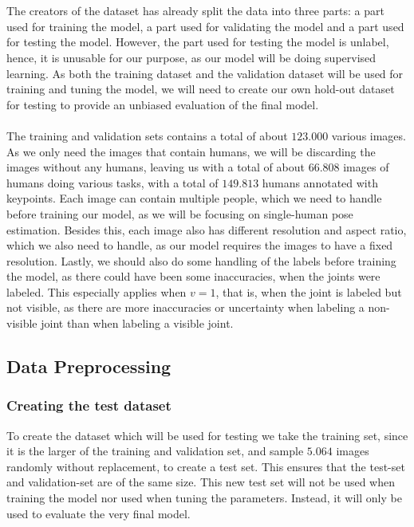 \documentclass[./main.tex]{subfiles}
\begin{document}
\\
\\
The creators of the dataset has already split the data into three parts: a part used for training the model, a part used for validating the model and a part used for testing the model. However, the part used for testing the model is unlabel, hence, it is unusable for our purpose, as our model will be doing supervised learning. As both the training dataset and the validation dataset will be used for training and tuning the model, we will need to create our own hold-out dataset for testing to provide an unbiased evaluation of the final model. 
\\
\\
The training and validation sets contains a total of about $123.000$ various images. As we only need the images that contain humans, we will be discarding the images without any humans, leaving us with a total of about $66.808$ images of humans doing various tasks, with a total of $149.813$ humans annotated with keypoints. Each image can contain multiple people, which we need to handle before training our model, as we will be focusing on single-human pose estimation. Besides this, each image also has different resolution and aspect ratio, which we also need to handle, as our model requires the images to have a fixed resolution. Lastly, we should also do some handling of the labels before training the model, as there could have been some inaccuracies, when the joints were labeled. This especially applies when $v = 1$, that is, when the joint is labeled but not visible, as there are more inaccuracies or uncertainty when labeling a non-visible joint than when labeling a visible joint.

\subsection{Data Preprocessing}
\subsubsection{Creating the test dataset}
To create the dataset which will be used for testing we take the training set, since it is the larger of the training and validation set, and sample $5.064$ images randomly without replacement, to create a test set. This ensures that the test-set and validation-set are of the same size. This new test set will not be used when training the model nor used when tuning the parameters. Instead, it will only be used to evaluate the very final model. 
\end{document}
